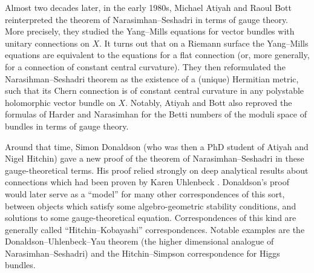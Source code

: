 \documentclass[12pt,a4paper]{amsbook}
\theoremstyle{remark} \newtheorem{rmk}[thm]{Remark}
\theoremstyle{definition} \newtheorem{defn}[thm]{Definition}
\theoremstyle{definition} \newtheorem{ex}[thm]{Example}
\theoremstyle{definition} \newtheorem{ej}{Exercise}
\begin{document}
Almost two decades later, in the early 1980s, Michael Atiyah and Raoul Bott \cite{AtiyahBott} reinterpreted the theorem of Narasimhan--Seshadri in terms of gauge theory. More precisely, they studied the Yang--Mills equations for vector bundles with unitary connections on $X$. It turns out that on a Riemann surface the Yang--Mills equations are equivalent to the equations for a flat connection (or, more generally, for a connection of constant central curvature). They then reformulated the Narasihman--Seshadri theorem as the existence of a (unique) Hermitian metric, such that its Chern connection is of constant central curvature in any polystable holomorphic vector bundle on $X$. Notably, Atiyah and Bott also reproved the formulas of Harder and Narasimhan for the Betti numbers of the moduli space of bundles in terms of gauge theory.

Around that time, Simon Donaldson (who was then a PhD student of Atiyah and Nigel Hitchin) gave a new proof of the theorem of Narasimhan--Seshadri \cite{DonaldsonNS} in these gauge-theoretical terms. His proof relied strongly on deep analytical results about connections which had been proven by Karen Uhlenbeck \cite{Uhlenbeck}. Donaldson's proof would later serve as a ``model'' for many other correspondences of this sort, between objects which satisfy some algebro-geometric stability conditions, and solutions to some gauge-theoretical equation. Correspondences of this kind are generally called ``Hitchin--Kobayashi'' correspondences. Notable examples are the Donaldson--Uhlenbeck--Yau theorem \cite{Donaldson, UhlenbeckYau} (the higher dimensional analogue of Narasimhan--Seshadri) and the Hitchin--Simpson \cite{Hitchin_SelfDuality,Simpson_Variations} correspondence for Higgs bundles.
\end{document}
